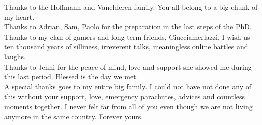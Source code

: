 Thanks to the Hoffmann and Vanelderen family. You all belong to a big chunk of my heart.\\

Thanks to Adrian, Sam, Paolo for the preparation in the last steps of the PhD. \\

Thanks to my clan of gamers and long term friends, Ciucciamerlazzi. I wish us ten thousand years of silliness, irreverent talks, meaningless online battles and laughs.\\

Thanks to Jenni for the peace of mind, love and support she showed me during this last period. Blessed is the day we met.\\

A special thanks goes to my entire big family. I could not have not done any of this without your support, love, emergency parachutes, advices and countless moments together. I never felt far from all of you even though we are not living anymore in the same country. Forever yours.\\


